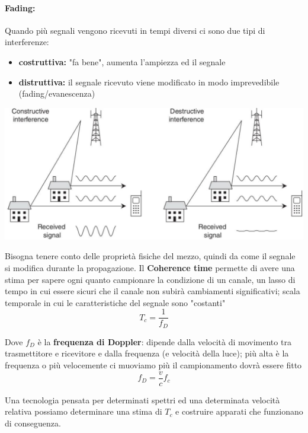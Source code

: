 \paragraph{Fading:} Quando più segnali vengono ricevuti in tempi diversi ci sono due tipi di interferenze: 
\begin{itemize}
	\item \textbf{costruttiva:} "fa bene", aumenta l'ampiezza ed il segnale
	\item \textbf{distruttiva:} il segnale ricevuto viene modificato in modo imprevedibile (fading/evanescenza)
\end{itemize}
\begin{center}
	\includegraphics[width=0.85\linewidth]{img/wireless/fading}
\end{center}

Bisogna tenere conto delle proprietà fisiche del mezzo, quindi da come il segnale si modifica durante la propagazione. Il \textbf{Coherence time} permette di avere una stima per sapere ogni quanto campionare la condizione di un canale, un lasso di tempo in cui essere sicuri che il canale non subirà cambiamenti significativi; scala temporale in cui le caratteristiche del segnale sono "costanti"
$$ T_c = \frac{1}{f_D}$$

Dove $f_D$ è la \textbf{frequenza di Doppler}: dipende dalla velocità di movimento tra trasmettitore e ricevitore e dalla frequenza (e velocità della luce); più alta è la frequenza o più velocemente ci muoviamo più il campionamento dovrà essere fitto
$$ f_D = \frac{v}{c} f_c$$

Una tecnologia pensata per determinati spettri ed una determinata velocità relativa possiamo determinare una stima di $T_c$ e costruire apparati che funzionano di conseguenza.\\

\newpage

